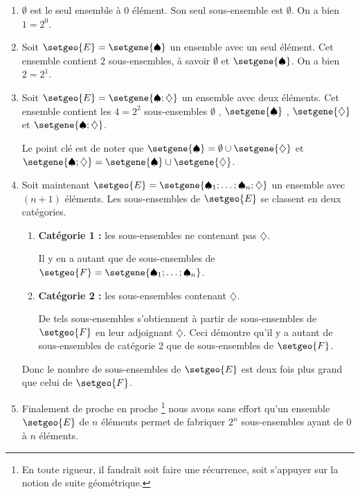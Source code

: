 \documentclass[12pt]{amsart}
\begin{document}
\begin{enumerate}
	\medskip
	\item $\emptyset$ est le seul ensemble à $0$ élément. Son seul sous-ensemble est $\emptyset$. On a bien $1 = 2^0$.


	\medskip
	\item Soit $\setgeo{E} = \setgene{\spadesuit}$ un ensemble avec un seul élément. Cet ensemble contient $2$ sous-ensembles, à savoir $\emptyset$ et $\setgene{\spadesuit}$. On a bien $2 = 2^1$.


	\medskip
	\item Soit $\setgeo{E} = \setgene{\spadesuit ; \diamondsuit}$ un ensemble avec deux éléments.
	      Cet ensemble contient les $4 = 2^2$ sous-ensembles
	      $\emptyset$ , $\setgene{\spadesuit}$ ,
	      $\setgene{\diamondsuit}$ et $\setgene{\spadesuit ; \diamondsuit}$.
	
	      \noindent
	      Le point clé est de noter que
	      $\setgene{\spadesuit} = \emptyset \cup \setgene{\diamondsuit}$ et
	      $\setgene{\spadesuit ; \diamondsuit} = \setgene{\spadesuit} \cup \setgene{\diamondsuit}$.

	\medskip
	\item Soit maintenant $\setgeo{E} = \setgene{\spadesuit_1 ; \dots ; \spadesuit_n ; \diamondsuit}$ un ensemble avec $(n+1)$ éléments.
		  Les sous-ensembles de $\setgeo{E}$ se classent en deux catégories.
		  
		  \begin{enumerate}
		  		\smallskip
				\item \textbf{Catégorie 1 :} les sous-ensembles ne contenant pas $\diamondsuit$.
				      
				      \smallskip
				      
				      Il y en a autant que de sous-ensembles de $\setgeo{F} = \setgene{\spadesuit_1 ; \dots ; \spadesuit_{n}}$.
		  		
				\smallskip
				\item \textbf{Catégorie 2 :} les sous-ensembles contenant $\diamondsuit$.
				      
				      \smallskip
				      
				      De tels sous-ensembles s'obtiennent à partir de sous-ensembles de $\setgeo{F}$ en leur adjoignant $\diamondsuit$.
				      Ceci démontre qu'il y a autant de sous-ensembles de catégorie 2 que de sous-ensembles de $\setgeo{F}$.
		  \end{enumerate}

		  \noindent
		  Donc le nombre de sous-ensembles de $\setgeo{E}$ est deux fois plus grand que celui de $\setgeo{F}$.


	\medskip
	\item Finalement de proche en proche
	\footnote{
		En toute rigueur, il faudrait soit faire une récurrence, soit s'appuyer sur la notion de suite géométrique.
	}
	nous avons sans effort qu'un ensemble $\setgeo{E}$ de $n$ éléments permet de fabriquer $2^n$ sous-ensembles ayant de $0$ à $n$ éléments.
\end{enumerate}
\end{document}
